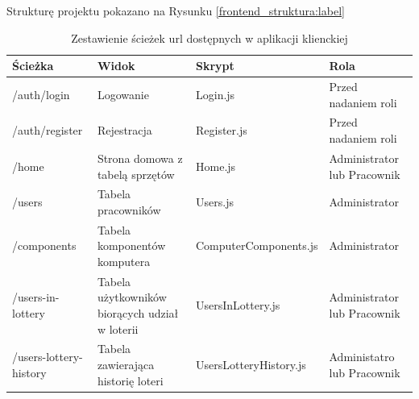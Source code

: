 Strukturę projektu pokazano na Rysunku \ref{frontend_struktura:label}


\begin{table}[htb] \small
	\centering
\caption{Zestawienie ścieżek url dostępnych w aplikacji klienckiej}
\label{tab:zestawienie_widokow}
\begin{tabularx}{\linewidth}{|X|X|X|X|}
    \hline
    Ścieżka & Widok & Skrypt & Rola\\
    \hline \hline
    /auth/login & Logowanie &  Login.js & Przed nadaniem roli\\
    \hline
    /auth/register & Rejestracja & Register.js & Przed nadaniem roli\\
    \hline
    /home & Strona domowa z tabelą sprzętów & Home.js & Administrator lub Pracownik\\
    \hline
    /users & Tabela pracowników & Users.js & Administrator\\
    \hline
		/components & Tabela komponentów komputera& ComputerComponents.js & Administrator\\
    \hline
		/users-in-lottery & Tabela użytkowników biorących udział w loterii& UsersInLottery.js & Administrator lub Pracownik\\
    \hline
		/users-lottery-history & Tabela zawierająca historię loteri & UsersLotteryHistory.js & Administatro lub Pracownik\\

    \hline
\end{tabularx}
\end{table}


